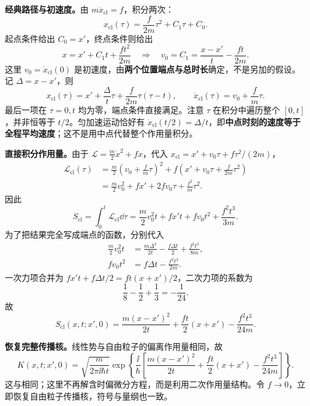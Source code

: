 \begin{checkedsolution}
\textbf{经典路径与初速度。}由 $m\ddot x_{\mathrm{cl}}=f$，积分两次：
\begin{equation}
  x_{\mathrm{cl}}(\tau)=\frac{f}{2m}\tau^2+C_1\tau+C_0.
\end{equation}
起点条件给出 $C_0=x'$，终点条件则给出
\begin{equation}
  x=x'+C_1t+\frac{ft^2}{2m}
  \quad\Longrightarrow\quad
  \boxed{v_0=C_1=\frac{x-x'}t-\frac{ft}{2m}}.
\end{equation}
这里 $v_0=\dot x_{\mathrm{cl}}(0)$ 是初速度，由\textbf{两个位置端点与总时长}确定，不是另加的假设。记 $\Delta=x-x'$，则
\begin{equation}
  \boxed{x_{\mathrm{cl}}(\tau)
    =x'+\frac{\Delta}{t}\tau+\frac{f}{2m}\tau(\tau-t)},
  \qquad \dot x_{\mathrm{cl}}(\tau)=v_0+\frac fm\tau.
\end{equation}
最后一项在 $\tau=0,t$ 均为零，端点条件直接满足。注意 $\tau$ 在积分中遍历整个 $[0,t]$，并非恒等于 $t/2$。匀加速运动恰好有 $\dot x_{\mathrm{cl}}(t/2)=\Delta/t$，即\textbf{中点时刻的速度等于全程平均速度}；这不是用中点代替整个作用量积分。

\textbf{直接积分作用量。}由于 $\mathcal L=\frac m2\dot x^2+fx$，代入 $x_{\mathrm{cl}}=x'+v_0\tau+f\tau^2/(2m)$，
\begin{align}
  \mathcal L_{\mathrm{cl}}(\tau)
  &=\frac m2\left(v_0+\frac fm\tau\right)^2
    +f\left(x'+v_0\tau+\frac{f}{2m}\tau^2\right)\\
  &=\frac m2v_0^2+fx'+2fv_0\tau+\frac{f^2}{m}\tau^2.
\end{align}
因此
\begin{equation}
  S_{\mathrm{cl}}=\int_0^t\mathcal L_{\mathrm{cl}}\dd\tau
    =\frac m2v_0^2t+fx't+fv_0t^2+\frac{f^2t^3}{3m}.
\end{equation}
为了把结果完全写成端点的函数，分别代入
\begin{align}
  \frac m2v_0^2t&=\frac{m\Delta^2}{2t}-\frac{f\Delta t}{2}
     +\frac{f^2t^3}{8m},\\
  fv_0t^2&=f\Delta t-\frac{f^2t^3}{2m}.
\end{align}
一次力项合并为 $fx't+f\Delta t/2=ft(x+x')/2$，二次力项的系数为
\begin{equation}
  \frac18-\frac12+\frac13=-\frac1{24}.
\end{equation}
故
\begin{equation}
  \boxed{S_{\mathrm{cl}}(x,t;x',0)
    =\frac{m(x-x')^2}{2t}+\frac{ft}{2}(x+x')-\frac{f^2t^3}{24m}}.
\end{equation}

\textbf{恢复完整传播核。}线性势与自由粒子的偏离作用量相同，故
\begin{equation}
  \boxed{K(x,t;x',0)=\sqrt{\frac{m}{2\pi\ii\hbar t}}
    \exp\!\left\{\frac{\ii}{\hbar}\left[
    \frac{m(x-x')^2}{2t}+\frac{ft}{2}(x+x')-\frac{f^2t^3}{24m}
    \right]\right\}}.
\end{equation}
这与相同；这里不再解含时偏微分方程，而是利用二次作用量结构。令 $f\to0$，立即恢复自由粒子传播核，符号与量纲也一致。
\end{checkedsolution}


